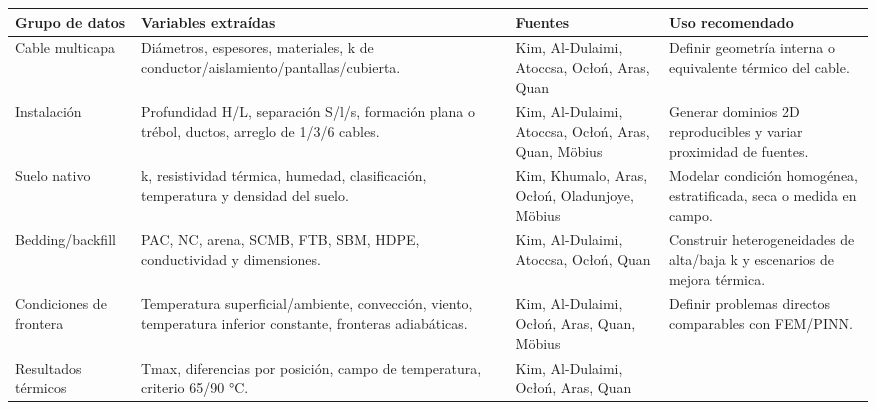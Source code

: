 \documentclass[11pt,a4paper,oneside]{report}
\newcounter{none}
\begin{document}
{\def\LTcaptype{none} %
\begin{longtable}[]{@{}
  >{\raggedright\arraybackslash}p{}
  >{\raggedright\arraybackslash}p{}
  >{\raggedright\arraybackslash}p{}
  >{\raggedright\arraybackslash}p{}@{}}
\toprule\noalign{}
\begin{minipage}[b]{\linewidth}\raggedright
Grupo de datos
\end{minipage} & \begin{minipage}[b]{\linewidth}\raggedright
Variables extraídas
\end{minipage} & \begin{minipage}[b]{\linewidth}\raggedright
Fuentes
\end{minipage} & \begin{minipage}[b]{\linewidth}\raggedright
Uso recomendado
\end{minipage} \\
\midrule\noalign{}
\endhead
\bottomrule\noalign{}
\endlastfoot
Cable multicapa & Diámetros, espesores, materiales, k de
conductor/aislamiento/pantallas/cubierta. & Kim, Al-Dulaimi, Atoccsa,
Ocłoń, Aras, Quan & Definir geometría interna o equivalente térmico del
cable. \\
Instalación & Profundidad H/L, separación S/l/s, formación plana o
trébol, ductos, arreglo de 1/3/6 cables. & Kim, Al-Dulaimi, Atoccsa,
Ocłoń, Aras, Quan, Möbius & Generar dominios 2D reproducibles y variar
proximidad de fuentes. \\
Suelo nativo & k, resistividad térmica, humedad, clasificación,
temperatura y densidad del suelo. & Kim, Khumalo, Aras, Ocłoń,
Oladunjoye, Möbius & Modelar condición homogénea, estratificada, seca o
medida en campo. \\
Bedding/backfill & PAC, NC, arena, SCMB, FTB, SBM, HDPE, conductividad y
dimensiones. & Kim, Al-Dulaimi, Atoccsa, Ocłoń, Quan & Construir
heterogeneidades de alta/baja k y escenarios de mejora térmica. \\
Condiciones de frontera & Temperatura superficial/ambiente, convección,
viento, temperatura inferior constante, fronteras adiabáticas. & Kim,
Al-Dulaimi, Ocłoń, Aras, Quan, Möbius & Definir problemas directos
comparables con FEM/PINN. \\
Resultados térmicos & Tmax, diferencias por posición, campo de
temperatura, criterio 65/90 °C. & Kim, Al-Dulaimi, Ocłoń, Aras, Quan &

\end{longtable}}
\end{document}
